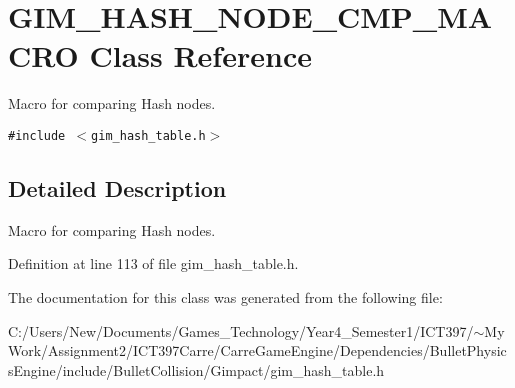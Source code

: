 \hypertarget{class_g_i_m___h_a_s_h___n_o_d_e___c_m_p___m_a_c_r_o}{
\section{GIM\_\-HASH\_\-NODE\_\-CMP\_\-MACRO Class Reference}
\label{class_g_i_m___h_a_s_h___n_o_d_e___c_m_p___m_a_c_r_o}
}
Macro for comparing Hash nodes.  


{\tt \#include $<$gim\_\-hash\_\-table.h$>$}



\subsection{Detailed Description}
Macro for comparing Hash nodes. 

Definition at line 113 of file gim\_\-hash\_\-table.h.

The documentation for this class was generated from the following file:\begin{CompactItemize}
\item 
C:/Users/New/Documents/Games\_\-Technology/Year4\_\-Semester1/ICT397/$\sim$My Work/Assignment2/ICT397Carre/CarreGameEngine/Dependencies/BulletPhysicsEngine/include/BulletCollision/Gimpact/gim\_\-hash\_\-table.h\end{CompactItemize}
